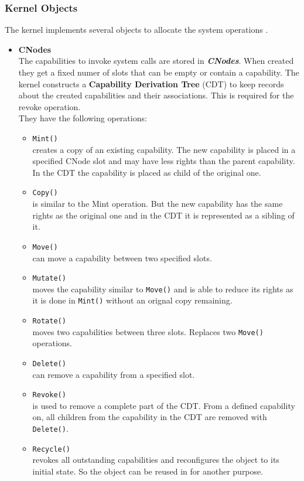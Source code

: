 \subsubsection{Kernel Objects}\label{sec:KernelObjects}
The kernel implements several objects to allocate the system operations \cite{Manual}.
\begin{itemize}
\item \textbf{CNodes} \\
The capabilities to invoke system calls are stored in \textbf{\textit{CNodes}}. When created they get a fixed numer of slots that can be empty or contain a capability. 
The kernel constructs a \textbf{Capability Derivation Tree} (CDT) to keep records about the created capabilities and their associations. This is required for the revoke operation. \\ 
They have the following operations:
\begin{itemize}
\item \texttt{Mint()} \\
creates a copy of an existing capability. The new capability is placed in a specified CNode slot and may have less rights than the parent capability. In the CDT the capability is placed as child of the original one. 
\item \texttt{Copy()} \\
is similar to the Mint operation. But the new capability has the same rights as the original one and in the CDT it is represented as a sibling of it. 
\item \texttt{Move()} \\
can move a capability between two specified slots. 
\item \texttt{Mutate()} \\
moves the capability similar to \texttt{Move()} and is able to reduce its rights as it is done in \texttt{Mint()} without an orignal copy remaining.
\item \texttt{Rotate()} \\
moves two capabilities between three slots. Replaces two \texttt{Move()} operations. 
\item \texttt{Delete()} \\
can remove a capability from a specified slot.
\item \texttt{Revoke()} \\
is used to remove a complete part of the CDT. From a defined capability on, all children from the capability in the CDT are removed with \texttt{Delete()}. 
\item \texttt{Recycle()} \\
revokes all outstanding capabilities and reconfigures the object to its initial state. So the object can be reused in for another purpose.
\end{itemize}


\end{itemize}
